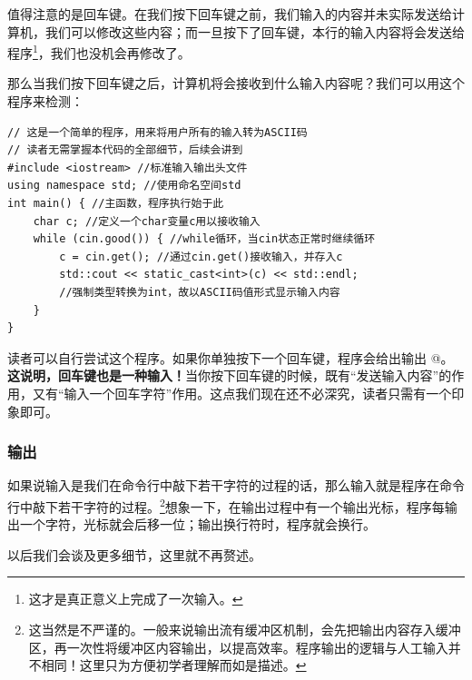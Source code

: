 值得注意的是回车键。在我们按下回车键之前，我们输入的内容并未实际发送给计算机，我们可以修改这些内容；而一旦按下了回车键，本行的输入内容将会发送给程序\footnote{这才是真正意义上完成了一次输入。}，我们也没机会再修改了。\par
那么当我们按下回车键之后，计算机将会接收到什么输入内容呢？我们可以用这个程序来检测：
\begin{lstlisting}[caption=\texttt{Input\_to\_ASCII.cpp},label={lst:InputToASCII}]
// 这是一个简单的程序，用来将用户所有的输入转为ASCII码
// 读者无需掌握本代码的全部细节，后续会讲到
#include <iostream> //标准输入输出头文件
using namespace std; //使用命名空间std
int main() { //主函数，程序执行始于此
    char c; //定义一个char变量c用以接收输入
    while (cin.good()) { //while循环，当cin状态正常时继续循环
        c = cin.get(); //通过cin.get()接收输入，并存入c
        std::cout << static_cast<int>(c) << std::endl;
        //强制类型转换为int，故以ASCII码值形式显示输入内容
    }
}
\end{lstlisting}
读者可以自行尝试这个程序。如果你单独按下一个回车键，程序会给出输出 @。\textbf{这说明，回车键也是一种输入！}当你按下回车键的时候，既有``发送输入内容''的作用，又有``输入一个回车字符''作用。这点我们现在还不必深究，读者只需有一个印象即可。\par
\subsubsection*{输出}
如果说输入是我们在命令行中敲下若干字符的过程的话，那么输入就是程序在命令行中敲下若干字符的过程。\footnote{这当然是不严谨的。一般来说输出流有缓冲区机制，会先把输出内容存入缓冲区，再一次性将缓冲区内容输出，以提高效率。程序输出的逻辑与人工输入并不相同！这里只为方便初学者理解而如是描述。}想象一下，在输出过程中有一个输出光标，程序每输出一个字符，光标就会后移一位；输出换行符时，程序就会换行。\par
以后我们会谈及更多细节，这里就不再赘述。\par
